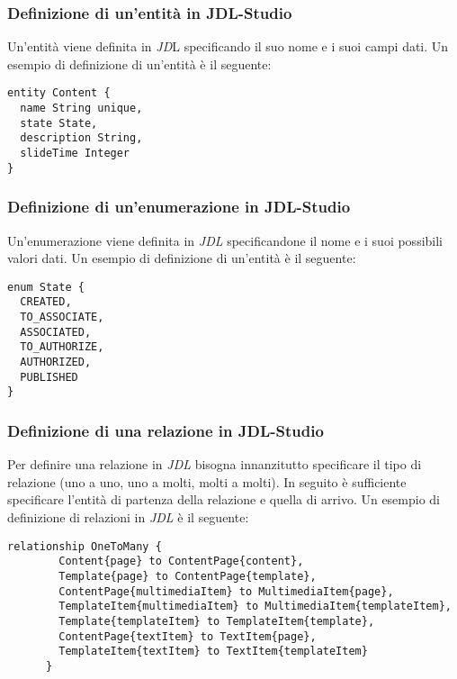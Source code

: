 \subsubsection{Definizione di un'entità in JDL-Studio}
Un'entità viene definita in \textit{JD}L specificando il suo nome e i suoi campi dati. Un esempio di definizione di un'entità è il seguente:
\begin{lstlisting}[caption={Definizione entità Content},label={lst:ent}]
entity Content {
  name String unique,
  state State,
  description String,
  slideTime Integer
}
\end{lstlisting}
\subsubsection{Definizione di un'enumerazione in JDL-Studio}
Un'enumerazione viene definita in \textit{JDL} specificandone il nome e i suoi possibili valori dati. Un esempio di definizione di un'entità è il seguente:
\begin{lstlisting}[caption={Definizione enumerazione State},label={lst:en}]
enum State {
  CREATED,
  TO_ASSOCIATE,
  ASSOCIATED,
  TO_AUTHORIZE,
  AUTHORIZED,
  PUBLISHED
}
\end{lstlisting}
\subsubsection{Definizione di una relazione in JDL-Studio}
Per definire una relazione in \textit{JDL} bisogna innanzitutto specificare il tipo di relazione (uno a uno, uno a molti, molti a molti). In seguito è sufficiente specificare l'entità di partenza della relazione e quella di arrivo. Un esempio di definizione di relazioni in \textit{JDL} è il seguente:
\begin{lstlisting}[caption={Definizione relazioni uno a molti},label={lst:rel}]
    relationship OneToMany {
        Content{page} to ContentPage{content},
        Template{page} to ContentPage{template},
        ContentPage{multimediaItem} to MultimediaItem{page},
        TemplateItem{multimediaItem} to MultimediaItem{templateItem},
        Template{templateItem} to TemplateItem{template},
        ContentPage{textItem} to TextItem{page},
        TemplateItem{textItem} to TextItem{templateItem}
      }
\end{lstlisting}
\newpage
